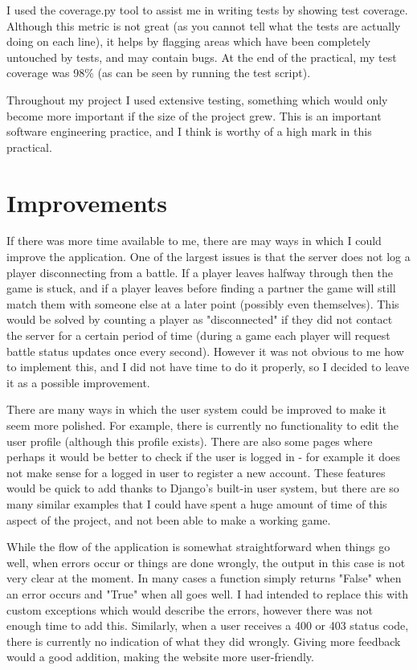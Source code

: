 \documentclass{article}
\begin{document}
I used the coverage.py tool to assist me in writing tests by showing test coverage. Although this metric is not great (as you cannot tell what the tests are actually doing on each line), it helps by flagging areas which have been completely untouched by tests, and may contain bugs. At the end of the practical, my test coverage was 98\% (as can be seen by running the test script).

Throughout my project I used extensive testing, something which would only become more important if the size of the project grew. This is an important software engineering practice, and I think is worthy of a high mark in this practical.

\section{Improvements}

If there was more time available to me, there are may ways in which I could improve the application. One of the largest issues is that the server does not log a player disconnecting from a battle. If a player leaves halfway through then the game is stuck, and if a player leaves before finding a partner the game will still match them with someone else at a later point (possibly even themselves). This would be solved by counting a player as "disconnected" if they did not contact the server for a certain period of time (during a game each player will  request battle status updates once every second). However it was not obvious to me how to implement this, and I did not have time to do it properly, so I decided to leave it as a possible improvement.

There are many ways in which the user system could be improved to make it seem more polished. For example, there is currently no functionality to edit the user profile (although this profile exists). There are also some pages where perhaps it would be better to check if the user is logged in - for example it does not make sense for a logged in user to register a new account. These features would be quick to add thanks to Django's built-in user system, but there are so many similar examples that I could have spent a huge amount of time of this aspect of the project, and not been able to make a working game.

While the flow of the application is somewhat straightforward when things go well, when errors occur or things are done wrongly, the output in this case is not very clear at the moment. In many cases a function simply returns "False" when an error occurs and "True" when all goes well. I had intended to replace this with custom exceptions which would describe the errors, however there was not enough time to add this. Similarly, when a user receives a 400 or 403 status code, there is currently no indication of what they did wrongly. Giving more feedback would a good addition, making the website more user-friendly.
\end{document}
